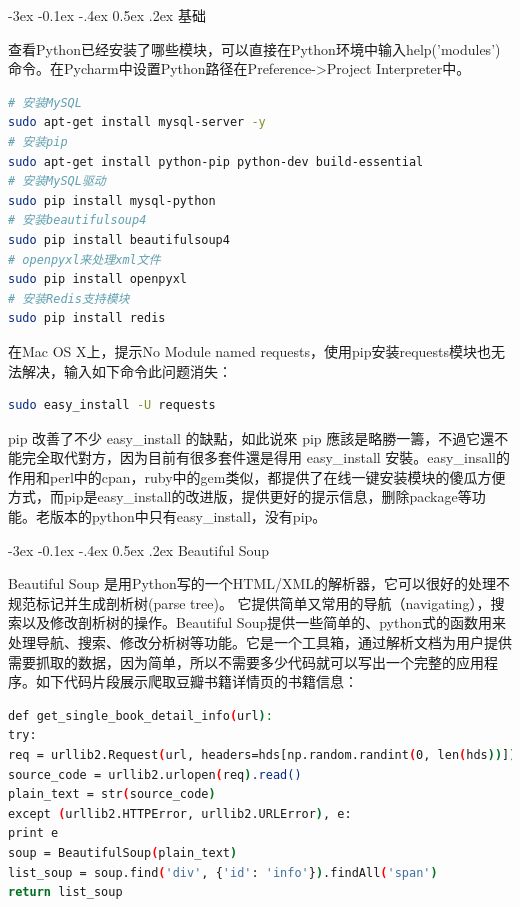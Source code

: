 \documentclass[12pt]{book}
\makeatletter
\numberwithin{dummy}{section}
\theoremstyle{ocrenumbox}
\theoremstyle{blacknumex}
\theoremstyle{blacknumbox}
\theoremstyle{ocrenum}
\renewcommand{\subsection}{\@startsection {subsection}{2}{\z@}
	{-3ex \@plus -0.1ex \@minus -.4ex}
	{0.5ex \@plus.2ex }
	{\normalfont\sffamily\bfseries}}
\makeatother
\begin{document}
\subsection{基础}

查看Python已经安装了哪些模块，可以直接在Python环境中输入help('modules')命令。在Pycharm中设置Python路径在Preference->Project Interpreter中。

\begin{lstlisting}[language=Bash]
# 安装MySQL
sudo apt-get install mysql-server -y
# 安装pip
sudo apt-get install python-pip python-dev build-essential
# 安装MySQL驱动
sudo pip install mysql-python
# 安装beautifulsoup4
sudo pip install beautifulsoup4
# openpyxl来处理xml文件
sudo pip install openpyxl
# 安装Redis支持模块
sudo pip install redis
\end{lstlisting}

在Mac OS X上，提示No Module named requests，使用pip安装requests模块也无法解决，输入如下命令此问题消失：

\begin{lstlisting}[language=Bash]
sudo easy_install -U requests
\end{lstlisting}

pip 改善了不少 easy\_install 的缺點，如此说來 pip 應該是略勝一籌，不過它還不能完全取代對方，因为目前有很多套件還是得用 easy\_install 安裝。easy\_insall的作用和perl中的cpan，ruby中的gem类似，都提供了在线一键安装模块的傻瓜方便方式，而pip是easy\_install的改进版，提供更好的提示信息，删除package等功能。老版本的python中只有easy\_install，没有pip。

\subsection{Beautiful Soup}

Beautiful Soup 是用Python写的一个HTML/XML的解析器，它可以很好的处理不规范标记并生成剖析树(parse tree)。 它提供简单又常用的导航（navigating），搜索以及修改剖析树的操作。Beautiful Soup提供一些简单的、python式的函数用来处理导航、搜索、修改分析树等功能。它是一个工具箱，通过解析文档为用户提供需要抓取的数据，因为简单，所以不需要多少代码就可以写出一个完整的应用程序。如下代码片段展示爬取豆瓣书籍详情页的书籍信息：

\begin{lstlisting}[language=Bash]
def get_single_book_detail_info(url):
try:
req = urllib2.Request(url, headers=hds[np.random.randint(0, len(hds))])
source_code = urllib2.urlopen(req).read()
plain_text = str(source_code)
except (urllib2.HTTPError, urllib2.URLError), e:
print e
soup = BeautifulSoup(plain_text)
list_soup = soup.find('div', {'id': 'info'}).findAll('span')
return list_soup
\end{lstlisting}
\end{document}
